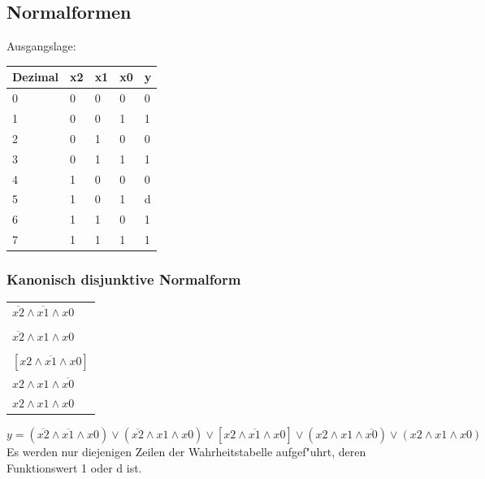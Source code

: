 \subsection{Normalformen}
	\begin{multicols}{3}
		Ausgangslage:\\
		\begin{tabular}{|l|l|l|l|l|}
			\hline	
				Dezimal & x2 & x1 & x0 & y \\	
			\hline
			\hline
				0 & 0 & 0 & 0 & 0 \\
			\hline	
				1 & 0 & 0 & 1 & 1 \\
			\hline
				2 & 0 & 1 & 0 & 0 \\
			\hline
				3 & 0 & 1 & 1 & 1 \\
			\hline
				4 & 1 & 0 & 0 & 0 \\
			\hline
				5 & 1 & 0 & 1 & d \\
			\hline
				6 & 1 & 1 & 0 & 1 \\
			\hline
				7 & 1 & 1 & 1 & 1 \\
			\hline
		\end{tabular}
		\columnbreak
		
		\subsubsection{Kanonisch disjunktive Normalform}
			\begin{tabular}{|l|}
				\hline
				\\
				\hline
					$\overline{x2} \wedge \overline{x1} \wedge x0$ \\
				\hline
				\\
				\hline
					$\overline{x2} \wedge x1 \wedge x0$ \\
				\hline
				\\
				\hline
					$[x2 \wedge \overline{x1} \wedge x0]$ \\
				\hline
					$x2 \wedge x1 \wedge \overline{x0}$ \\
				\hline
					$x2 \wedge x1 \wedge x0$ \\
				\hline	
			\end{tabular}
			$y=(\overline{x2} \wedge \overline{x1} \wedge x0) \vee (\overline{x2} \wedge x1 \wedge x0) \vee [x2 \wedge \overline{x1} \wedge x0] \vee (x2 \wedge x1 \wedge \overline{x0}) \vee (x2 \wedge x1 \wedge x0)$ \\
			Es werden nur diejenigen Zeilen der Wahrheitstabelle aufgef"uhrt, deren Funktionswert 1 oder d ist.
		\columnbreak
				

\end{multicols}
